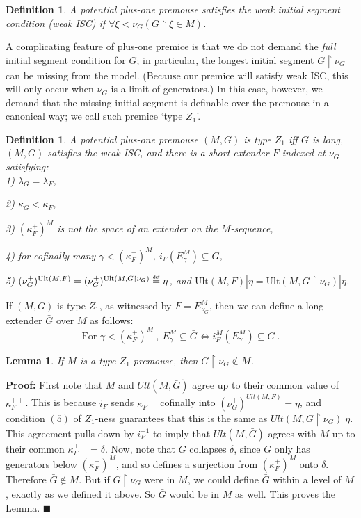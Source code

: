 \documentclass[12pt]{article}
\newtheorem{lem}[thm]{Lemma}
\newtheorem{defn}[thm]{Definition}
\newcommand\defeq{\mathrel{\overset{\makebox[0pt]{\mbox{\normalfont\tiny\sffamily def}}}{=}}}
\begin{document}
\begin{defn} \label{weak ISC} 
A potential plus-one premouse satisfies the \textit{weak initial segment condition} (weak ISC) if $\forall \xi < \nu_G (G \restriction \xi \in M)$.
\end{defn}

A complicating feature of plus-one premice is that we do not demand the \textit{full} initial segment condition for $G$; in particular, the longest initial segment $G \restriction \nu_G$ can be missing from the model.  (Because our premice will satisfy weak ISC, this will only occur when $\nu_G$ is a limit of generators.)  In this case, however, we demand that the missing initial segment is definable over the premouse in a canonical way; we call such premice `type $Z_1$'. \\

\begin{defn} \label{type $Z_1$}
A potential plus-one premouse $(M, G)$ is type $Z_1$ iff $G$ is long, $(M , G)$ satisfies the weak ISC, and there is a short extender $F$ indexed at $\nu_G$ satisfying:\\

	1) $\lambda_G = \lambda_F$,
	
	2) $\kappa_G < \kappa_F$,
	
	3) $(\kappa_F ^+ )^M$ is not the space of an extender on the $M$-sequence,
	
	4) for cofinally many $\gamma < (\kappa_F ^+ )^M$, $i_F (E_\gamma ^M) \subseteq G$,
	
	5) $(\nu_G ^+)^{\text{Ult}(M, F)} = (\nu_G ^+)^{\text{Ult}(M, G \restriction \nu_G)} \defeq \eta$, and $\text{Ult}(M, F) | \eta = \text{Ult}(M, G \restriction \nu_G) | \eta$.
\end{defn}
	
	
If $(M,G)$ is type $Z_1$, as witnessed by $F = E_{\nu_G} ^M$, then we can define a long extender $\bar{G}$ over $M$ as follows:\\

\[
\text{For } \gamma < (\kappa_F ^+)^M \ , \  E_\gamma ^M \subseteq \bar{G} \Longleftrightarrow  i_F ^M (E_\gamma ^M) \subseteq G \ .
\]

\begin{lem}
If $M$ is a type $Z_1$ premouse, then $G \restriction \nu_G \notin M$.
\end{lem}

\textbf{Proof:} First note that $M$ and $Ult(M , \bar{G})$ agree up to their common value of $\kappa_F^{++}$.  This is because $i_F$ sends $\kappa_F^{++}$ cofinally into $(\nu_G^+)^{Ult (M , F)} = \eta$, and condition $(5)$ of $Z_1$-ness guarantees that this is the same as $Ult (M , G \restriction \nu_G ) | \eta$.  This agreement pulls down by $i_F^{-1}$ to imply that $Ult(M , \bar{G})$ agrees with $M$ up to their common $\kappa_F^{++} = \delta$.  Now, note that $\bar{G}$ collapses $\delta$, since $\bar{G}$ only has generators below $(\kappa_F^+)^M$, and so defines a surjection from $(\kappa_F^+)^M$ onto $\delta$.  Therefore $\bar{G} \notin M$.  But if $G \restriction \nu_G$ were in $M$, we could define $\bar{G}$ within a level of $M$, exactly as we defined it above.  So $\bar{G}$ would be in $M$ as well.  This proves the Lemma. $\blacksquare$\\
\end{document}
